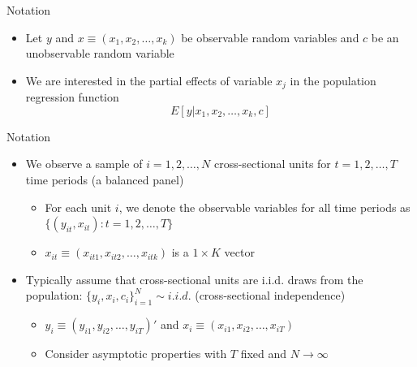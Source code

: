 \documentclass{beamer}
\begin{document}
\begin{frame}{Notation}

	
	\begin{itemize}
	\item Let $y$ and $x\equiv(x_1, x_2, \dots, x_k)$ be observable random variables and $c$ be an unobservable random variable
	\item We are interested in the partial effects of variable $x_j$ in the population regression function$$E[y|x_1,x_2,\dots,x_k,c]$$
	\end{itemize}
\end{frame}

\begin{frame}{Notation}

\begin{itemize}
	\item We observe a sample of $i=1,2,\dots,N$ cross-sectional units for $t=1,2,\dots,T$ time periods (a balanced panel)
		\begin{itemize}
		\item For each unit $i$, we denote the observable variables for all time periods as $\{(y_{it},x_{it}):t=1,2,\dots,T\}$
		\item $x_{it}\equiv(x_{it1},x_{it2}, \dots, x_{itk})$ is a $1\times K$ vector
		\end{itemize}
	\item Typically assume that cross-sectional units are i.i.d. draws from the population: $\{y_i, x_i, c_i\}^N_{i=1}\sim i.i.d.$ (cross-sectional independence)
		\begin{itemize}
		\item $y_i \equiv (y_{i1}, y_{i2}, \dots, y_{iT})'$ and $x_i \equiv (x_{i1},x_{i2}, \dots, x_{iT})$
		\item Consider asymptotic properties with $T$ fixed and $N\rightarrow \infty$
		\end{itemize}
\end{itemize}

\end{frame}
\end{document}
